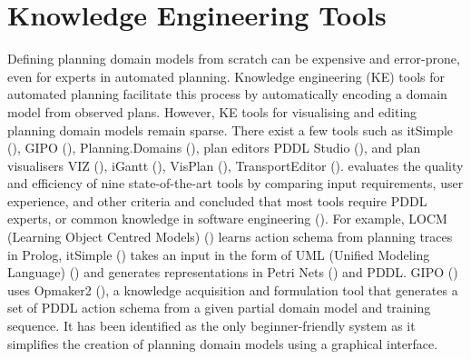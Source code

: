 \section{Knowledge Engineering Tools}\label{subsec:Knowledge Engineering}
Defining planning domain models from scratch can be expensive and error-prone, even for experts in automated planning.
Knowledge engineering (KE) tools for automated planning facilitate this process by automatically encoding a domain model from observed plans.
However, KE tools for visualising and editing planning domain models remain sparse.
There exist a few tools such as itSimple (\cite{vaquero2013itsimple}), GIPO (\cite{simpson2007planning}), Planning.Domains (\cite{muise2016planning}), plan editors \eg PDDL Studio (\cite{plch2012inspect}), and plan visualisers \eg VIZ (\cite{vodrazka2010visual}), iGantt (\cite{bartak2009local}), VisPlan (\cite{glinsky2011visplan}), TransportEditor (\cite{vskopek2017transporteditor}).
\cite{jilani2014automated} evaluates the quality and efficiency of nine state-of-the-art tools by comparing input requirements, user experience, and other criteria and concluded that most tools require PDDL experts, or common knowledge in software engineering (\cite{simpson2007planning,vaquero2013itsimple}).
For example, LOCM (Learning Object Centred Models) (\cite{cresswell2013acquiring}) learns action schema from planning traces in Prolog, 
itSimple (\cite{vaquero2013itsimple}) takes an input in the form of UML (Unified Modeling Language) (\cite{omg2005unified}) and generates representations in Petri Nets (\cite{murata1989petri}) and PDDL. 
GIPO (\cite{simpson2007planning}) uses Opmaker2 (\cite{mccluskey2009automated}), a knowledge acquisition and formulation tool that generates a set of PDDL action schema from a given partial domain model and training sequence.
It has been identified as the only beginner-friendly system as it simplifies the creation of planning domain models using a graphical interface.


